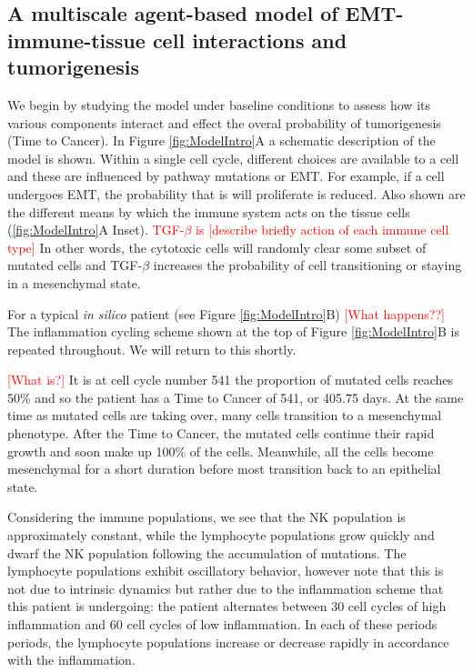 \documentclass[11pt, a4paper, preprint]{article}
\newcommand{\tcr} { \textcolor{red} }
\begin{document}
\subsection{A multiscale agent-based model of EMT-immune-tissue cell interactions and tumorigenesis}\label{ExplModel}
We begin by studying the model under baseline conditions to assess how its various components interact and effect the overal probability of tumorigenesis (Time to Cancer). In Figure \ref{fig:ModelIntro}A a schematic description of the model is shown. Within a single cell cycle, different choices are available to a cell and these are influenced by pathway mutations or EMT. For example, if a cell undergoes EMT, the probability that is will proliferate is reduced. Also shown are the different means by which the immune system acts on the tissue cells (\ref{fig:ModelIntro}A Inset). \tcr{TGF-$\beta$ is [describe briefly action of each immune cell type]}
In other words, the cytotoxic cells will randomly clear some subset of mutated cells and TGF-$\beta$ increases the probability of cell transitioning or staying in a mesenchymal state.

For a typical {\it in silico} patient (see Figure \ref{fig:ModelIntro}B) \tcr{[What happens??]}
The inflammation cycling scheme shown at the top of Figure \ref{fig:ModelIntro}B is repeated throughout.
We will return to this shortly.

\tcr{[What is?]} It is at cell cycle number 541 the proportion of mutated cells reaches 50\% and so the patient has a Time to Cancer of 541, or 405.75 days. 
At the same time as mutated cells are taking over, many cells transition to a mesenchymal phenotype.
After the Time to Cancer, the mutated cells continue their rapid growth and soon make up 100\% of the cells.
Meanwhile, all the cells become mesenchymal for a short duration before most transition back to an epithelial state.

Considering the immune populations, we see that the NK population is approximately constant, while the lymphocyte populations grow quickly and dwarf the NK population following the accumulation of mutations.
The lymphocyte populations exhibit oscillatory behavior, however note that this is not due to intrinsic dynamics but rather due to the inflammation scheme that this patient is undergoing: 
the patient alternates between 30 cell cycles of high inflammation and 60 cell cycles of low inflammation.
In each of these periods periods, the lymphocyte populations increase or decrease rapidly in accordance with the inflammation.
\end{document}
